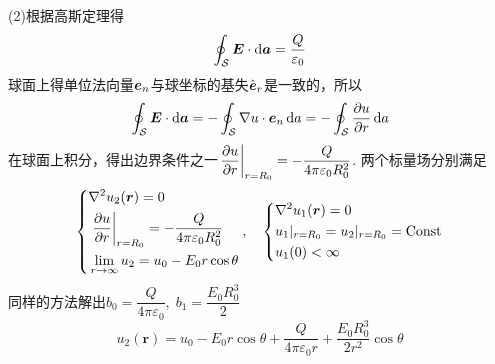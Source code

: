 \documentclass{mynote}
\begin{document}
\begin{solution}
    (2)根据高斯定理得
    \[
    \oint_{\mathcal{S}} \boldsymbol{E} \cdot \mathop{}\!\mathrm{d} \boldsymbol{a} = \frac{Q}{\varepsilon_0}    
    \]
    球面上得单位法向量$\boldsymbol{e}_n$与球坐标的基失$\hat{\boldsymbol{e}}_r$是一致的，所以
    \[
        \oint_{\mathcal{S}} \boldsymbol{E} \cdot \mathop{}\!\mathrm{d} \boldsymbol{a} = -\oint_{\mathcal{S}} \nabla u \cdot \boldsymbol{e}_n \mathop{}\!\mathrm{d} a = -\oint_{\mathcal{S}} \dfrac{\partial u}{\partial r} \mathop{}\!\mathrm{d} a
    \]
    在球面上积分，得出边界条件之一$\left. \dfrac{\partial u}{\partial r} \right|_{r=R_0} = -\dfrac{Q}{4\pi \varepsilon_0 R_0^2}$.
    两个标量场分别满足
    \[
    \left\{
        \begin{aligned}
            & \nabla^2 u_2(\boldsymbol{r}) = 0\\
            & \left. \dfrac{\partial u}{\partial r} \right|_{r=R_0} =  -\dfrac{Q}{4\pi \varepsilon_0 R_0^2} \\
            & \lim_{r\to \infty} u_2 = u_0 - E_0 r \cos \theta
        \end{aligned} 
    \right. ,\quad
    \left\{
        \begin{aligned}
            & \nabla^2 u_1(\boldsymbol{r}) = 0\\
            & u_1 |_{r=R_0} = u_2 |_{r = R_0} = \mathrm{Const} \\
            & u_1(0) < \infty
        \end{aligned} 
    \right.   
    \]
    同样的方法解出$b_0 = \dfrac{Q}{4\pi \varepsilon_0},\; b_1 = \dfrac{E_0 R_0^3}{2}$
    \[
        u_2(\bm{r}) = u_0 - E_0 r \cos \theta + \dfrac{Q}{4\pi \varepsilon_0 r} + \dfrac{E_0 R_0^3}{2r^2} \cos \theta
    \]
\end{solution}
\end{document}
